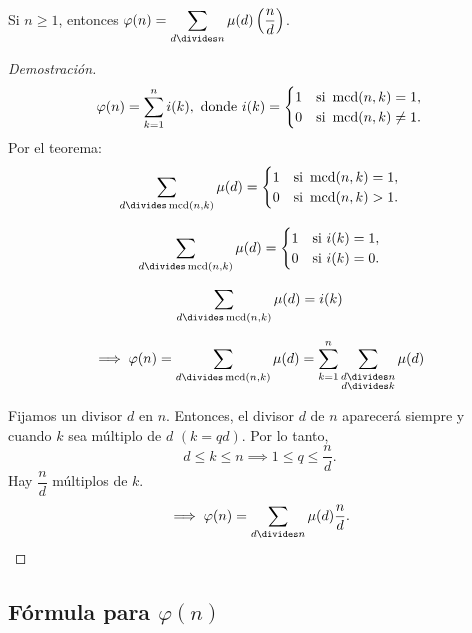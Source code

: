 \begin{theorem}
	Si $n\geq1$, entonces $\displaystyle\varphi(n)=\sum_{d\divides n}\mu(d)\left(\frac{n}{d}\right)$.
	\begin{proof}[Demostración]
		\[\varphi(n)=\sum_{k=1}^{n}i(k), \text{ donde } i(k)=\begin{cases}
		1 & \text{si } \operatorname{mcd}(n,k)=1,\\
		0 & \text{si } \operatorname{mcd}(n,k)\neq1.
		\end{cases}\]
		Por el teorema:
		\[\sum_{d\divides\mcd(n,k)}\mu(d)=\begin{cases}
		1 & \text{si }\mcd(n,k)=1,\\
		0 & \text{si } \mcd(n,k)>1.
		\end{cases}\]
		
		\[\sum_{d\divides\mcd(n,k)}\mu(d)=\begin{cases}
		1 & \text{si } i(k)=1,\\
		0 & \text{si } i(k)=0.
		\end{cases}\]
		
		\[\sum_{d\divides\mcd(n,k)}\mu(d)=i(k)\]
		
		\[\implies\varphi(n)=\sum_{d\divides\mcd(n,k)}\mu(d)=\sum_{k=1}^{n}\sum_{\substack{d\divides n\\
		d\divides k}}\mu(d)\]
	
		Fijamos un divisor $d$ en $n$. Entonces, el divisor $d$ de $n$ aparecerá siempre y cuando $k$ sea múltiplo de $d$ $(k=qd)$. Por lo tanto,
		\[d\leq k\leq n\implies 1\leq q\leq\frac{n}{d}.\]
		Hay $\dfrac{n}{d}$ múltiplos de $k$.
		\[\implies\varphi(n)=\sum_{d\divides n}\mu(d)\frac{n}{d}.\]
	\end{proof}
\end{theorem}

\subsection{Fórmula para $\varphi(n)$}

